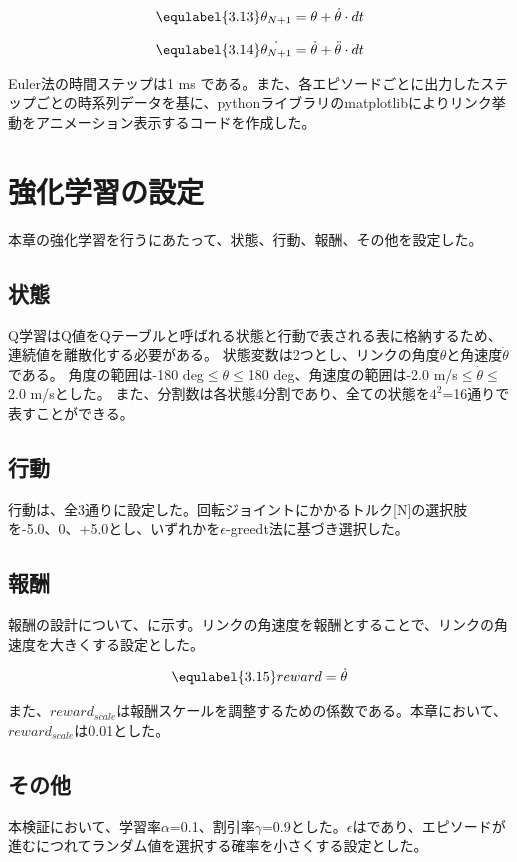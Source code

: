 \begin{eqnarray}
  \equlabel{3.13}
  \theta_{N + 1} = \theta + \dot{\theta} \cdot dt
\end{eqnarray}

\begin{eqnarray}
  \equlabel{3.14}
  \dot{\theta_{N + 1}} = \dot{\theta} + \ddot{\theta} \cdot dt
\end{eqnarray}

Euler法の時間ステップは1 ms である。また、各エピソードごとに出力したステップごとの時系列データを基に、pythonライブラリのmatplotlibによりリンク挙動をアニメーション表示するコードを作成した。
\section{強化学習の設定}
本章の強化学習を行うにあたって、状態、行動、報酬、その他を設定した。
\subsection{状態}
Q学習はQ値をQテーブルと呼ばれる状態と行動で表される表に格納するため、連続値を離散化する必要がある。
状態変数は2つとし、リンクの角度$\theta$と角速度$\dot{\theta}$である。
角度の範囲は-180 deg$\leq$$\theta$$\leq$180 deg、角速度の範囲は-2.0 m/s$\leq$$\dot{\theta}$$\leq$2.0 m/sとした。
また、分割数は各状態4分割であり、全ての状態を$4^{2}$=16通りで表すことができる。
\subsection{行動}
行動は、全3通りに設定した。回転ジョイントにかかるトルク[N]の選択肢を-5.0、0、+5.0とし、いずれかを$\epsilon$-greedt法に基づき選択した。
\subsection{報酬}
報酬の設計について、に示す。リンクの角速度を報酬とすることで、リンクの角速度を大きくする設定とした。

\begin{eqnarray}
  \equlabel{3.15}
  reward = \dot{\theta}
\end{eqnarray}

また、$reward_{scale}$は報酬スケールを調整するための係数である。本章において、$reward_{scale}$は0.01とした。\\
\subsection{その他}
本検証において、学習率$\alpha$=0.1、割引率$\gamma$=0.9とした。$\epsilon$はであり、エピソードが進むにつれてランダム値を選択する確率を小さくする設定とした。

